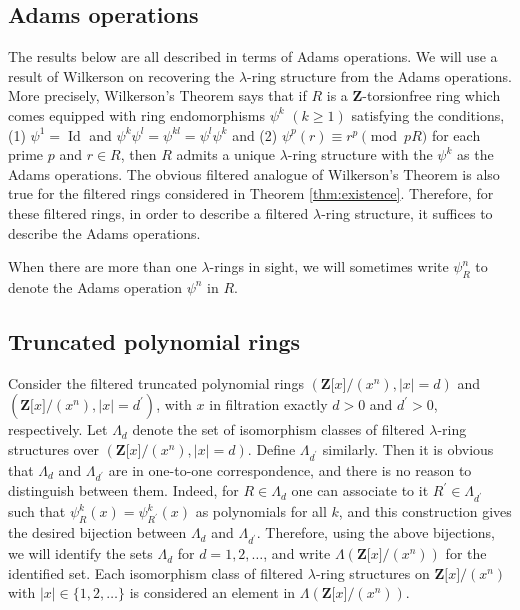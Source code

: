 \documentclass[reqno,11pt]{amsart}
\numberwithin{equation}{subsection}  %
\newcommand{\bZ}{\mathbf{Z}}
\DeclareMathOperator{\Id}{Id}
\begin{document}
\subsection*{Adams operations}
\label{subsec:adams op}

The results below are all described in terms of Adams operations.  We will use a result of Wilkerson \cite{wil} on recovering the $\lambda$-ring structure from the Adams operations.  More precisely, Wilkerson's Theorem says that if $R$ is a $\bZ$-torsionfree ring which comes equipped with ring endomorphisms $\psi^k$ $(k \geq 1)$ satisfying the conditions, (1) $\psi^1 = \Id$ and $\psi^k\psi^l = \psi^{kl} = \psi^l \psi^k$ and (2) $\psi^p(r) \equiv r^p \pmod{pR}$ for each prime $p$ and $r \in R$, then $R$ admits a unique $\lambda$-ring structure with the $\psi^k$ as the Adams operations.  The obvious filtered analogue of Wilkerson's Theorem is also true for the filtered rings considered in Theorem \ref{thm:existence}.  Therefore, for these filtered rings, in order to describe a filtered $\lambda$-ring structure, it suffices to describe the Adams operations.


When there are more than one $\lambda$-rings in sight, we will sometimes write $\psi^n_R$ to denote the Adams operation $\psi^n$ in $R$.




\subsection*{Truncated polynomial rings}
\label{subsec:truncated}


Consider the filtered truncated polynomial rings $(\bZ \lbrack x \rbrack/(x^n), \vert x \vert = d)$ and $(\bZ \lbrack x \rbrack/(x^n), \vert x \vert = d^\prime)$, with $x$ in filtration exactly $d > 0$ and $d^\prime > 0$, respectively.  Let $\Lambda_d$ denote the set of isomorphism classes of filtered $\lambda$-ring structures over $(\bZ \lbrack x \rbrack/(x^n), \vert x \vert = d)$.  Define $\Lambda_{d^\prime}$ similarly.  Then it is obvious that $\Lambda_d$ and $\Lambda_{d^\prime}$ are in one-to-one correspondence, and there is no reason to distinguish between them.  Indeed, for $R \in \Lambda_d$ one can associate to it $R^\prime \in \Lambda_{d^\prime}$ such that $\psi^k_R(x) = \psi^k_{R^\prime}(x)$ as polynomials for all $k$, and this construction gives the desired bijection between $\Lambda_d$ and $\Lambda_{d^\prime}$.  Therefore, using the above bijections, we will identify the sets $\Lambda_d$ for $d = 1, 2, \ldots$, and write $\Lambda(\bZ \lbrack x \rbrack/(x^n))$ for the identified set.  Each isomorphism class of filtered $\lambda$-ring structures on $\bZ \lbrack x \rbrack/(x^n)$ with $\vert x \vert \in \lbrace 1, 2, \ldots \rbrace$ is considered an element in $\Lambda(\bZ \lbrack x \rbrack/(x^n))$.
\end{document}
